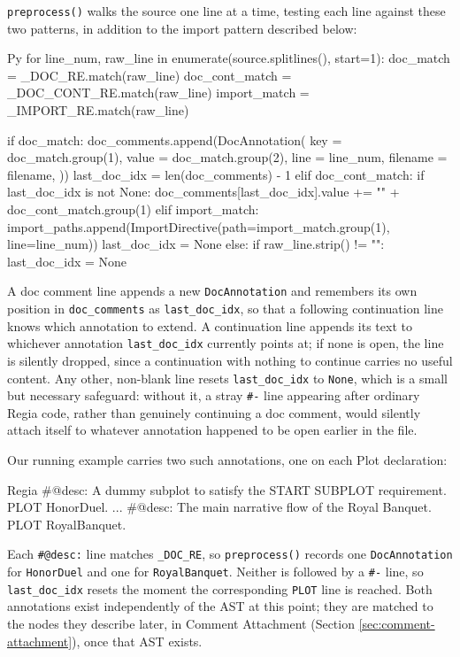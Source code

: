 \lstinline|preprocess()| walks the source one line at a time, testing each line against these two patterns, in addition to the import pattern described below:
\begin{codeblock}[]{Py}
for line_num, raw_line in enumerate(source.splitlines(), start=1):
    doc_match      = _DOC_RE.match(raw_line)
    doc_cont_match = _DOC_CONT_RE.match(raw_line)
    import_match   = _IMPORT_RE.match(raw_line)

    if doc_match:
        doc_comments.append(DocAnnotation(
            key      = doc_match.group(1),
            value    = doc_match.group(2),
            line     = line_num,
            filename = filename,
        ))
        last_doc_idx = len(doc_comments) - 1
    elif doc_cont_match:
        if last_doc_idx is not None:
            doc_comments[last_doc_idx].value += "\n" + doc_cont_match.group(1)
    elif import_match:
        import_paths.append(ImportDirective(path=import_match.group(1), line=line_num))
        last_doc_idx = None
    else:
        if raw_line.strip() != "":
            last_doc_idx = None
\end{codeblock}
A doc comment line appends a new \lstinline|DocAnnotation| and remembers its own position in \lstinline|doc_comments| as \lstinline|last_doc_idx|, so that a following continuation line knows which annotation to extend. A continuation line appends its text to whichever annotation \lstinline|last_doc_idx| currently points at; if none is open, the line is silently dropped, since a continuation with nothing to continue carries no useful content. Any other, non-blank line resets \lstinline|last_doc_idx| to \lstinline|None|, which is a small but necessary safeguard: without it, a stray \lstinline|#-| line appearing after ordinary Regia code, rather than genuinely continuing a doc comment, would silently attach itself to whatever annotation happened to be open earlier in the file.

Our running example carries two such annotations, one on each Plot declaration:
\begin{codeblock}[]{Regia}
#@desc: A dummy subplot to satisfy the START SUBPLOT requirement.
PLOT HonorDuel.
...
#@desc: The main narrative flow of the Royal Banquet.
PLOT RoyalBanquet.
\end{codeblock}
Each \lstinline|#@desc:| line matches \lstinline|_DOC_RE|, so \lstinline|preprocess()| records one \lstinline|DocAnnotation| for \lstinline|HonorDuel| and one for \lstinline|RoyalBanquet|. Neither is followed by a \lstinline|#-| line, so \lstinline|last_doc_idx| resets the moment the corresponding \lstinline|PLOT| line is reached. Both annotations exist independently of the AST at this point; they are matched to the nodes they describe later, in Comment Attachment (Section \ref{sec:comment-attachment}), once that AST exists.

